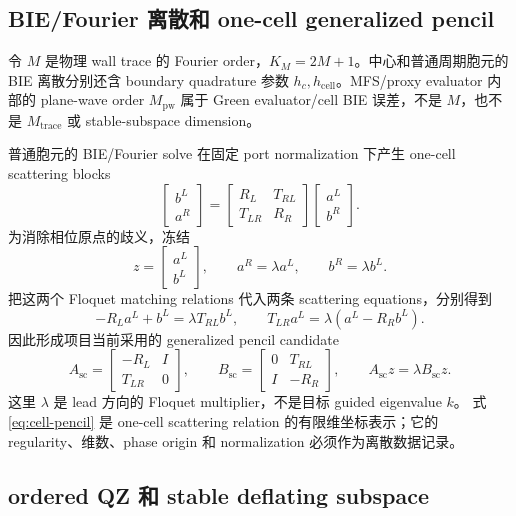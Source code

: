 \documentclass[UTF8,fontset=fandol,11pt,a4paper]{ctexart}
\begin{document}
\subsection{BIE/Fourier 离散和 one-cell generalized pencil}

令 $M$ 是物理 wall trace 的 Fourier order，$K_M=2M+1$。中心和普通周期胞元的 BIE
离散分别还含 boundary quadrature 参数 $h_c,h_{\mathrm{cell}}$。MFS/proxy evaluator
内部的 plane-wave order $M_{\mathrm{pw}}$ 属于 Green evaluator/cell BIE 误差，不是
$M$，也不是 $M_{\mathrm{trace}}$ 或 stable-subspace dimension。

普通胞元的 BIE/Fourier solve 在固定 port normalization 下产生 one-cell scattering
blocks
\[
  \begin{bmatrix}b^L\\a^R\end{bmatrix}
  =
  \begin{bmatrix}R_L&T_{RL}\\T_{LR}&R_R\end{bmatrix}
  \begin{bmatrix}a^L\\b^R\end{bmatrix}.
\]
为消除相位原点的歧义，冻结
\[
  z=\begin{bmatrix}a^L\\b^L\end{bmatrix},
  \qquad a^R=\lambda a^L,
  \qquad b^R=\lambda b^L.
\]
把这两个 Floquet matching relations 代入两条 scattering equations，分别得到
\[
  -R_La^L+b^L=\lambda T_{RL}b^L,
  \qquad
  T_{LR}a^L=\lambda(a^L-R_Rb^L).
\]
因此形成项目当前采用的 generalized pencil candidate
\begin{equation}
  A_{\mathrm{sc}}=
  \begin{bmatrix}-R_L&I\\T_{LR}&0\end{bmatrix},
  \qquad
  B_{\mathrm{sc}}=
  \begin{bmatrix}0&T_{RL}\\I&-R_R\end{bmatrix},
  \qquad
  A_{\mathrm{sc}}z=\lambda B_{\mathrm{sc}}z.
  \label{eq:cell-pencil}
\end{equation}
这里 $\lambda$ 是 lead 方向的 Floquet multiplier，不是目标 guided eigenvalue $k$。
式\eqref{eq:cell-pencil} 是 one-cell scattering relation 的有限维坐标表示；它的
regularity、维数、phase origin 和 normalization 必须作为离散数据记录。

\subsection{ordered QZ 和 stable deflating subspace}
\end{document}
